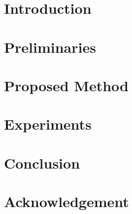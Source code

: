 \documentclass[10pt]{jarticle}
\begin{document}
\maketitle



\section{Introduction}\label{sec:Introduction}



\section{Preliminaries}\label{sec:Preliminaries}


\section{Proposed Method}\label{sec:ProposedMethod}



\section{Experiments}\label{sec:Experiments}


\section{Conclusion}\label{sec:Conclusion}


\clearpage

\section*{Acknowledgement}\label{sec:Acknowledgement}


\begin{spacing}{0.8}
    
    \small
    \setlength{\itemsep}{0pt}
    
\end{spacing}
\end{document}
